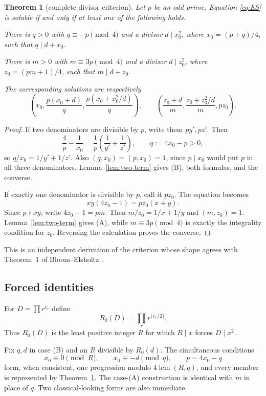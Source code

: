 \documentclass[10pt,reqno]{amsart}
\newtheorem{theorem}{Theorem}[section]
\theoremstyle{definition}
\newcommand{\lcm}{\operatorname {lcm}}
\newcommand{\1}{\mathbf 1}
\begin{document}
\begin{theorem}[complete divisor criterion]\label{thm:criterion}
Let $p$ be an odd prime.  Equation \eqref{eq:ES} is soluble if and only if at least one of the following holds.
\begin{description}[leftmargin=2.4em,style=nextline]
\item[(B)] There is $q>0$ with $q\equiv-p\pmod4$ and a divisor $d\mid x_0^2$, where $x_0=(p+q)/4$, such that $q\mid d+x_0$.
\item[(A)] There is $m>0$ with $m\equiv3p\pmod4$ and a divisor $d\mid z_0^2$, where $z_0=(pm+1)/4$, such that $m\mid d+z_0$.
\end{description}
The corresponding solutions are respectively
\[
 \left(x_0,\frac{p(x_0+d)}q,\frac{p(x_0+x_0^2/d)}q\right),
 \qquad
 \left(\frac{z_0+d}m,\frac{z_0+z_0^2/d}m,pz_0\right).
\]
\end{theorem}
\begin{proof}
If two denominators are divisible by $p$, write them $py',pz'$.  Then
\[
 \frac4p-\frac1{x_0}=\frac1p\left(\frac1{y'}+\frac1{z'}\right),
 \qquad q:=4x_0-p>0,
\]
so $q/x_0=1/y'+1/z'$.  Also $(q,x_0)=(p,x_0)=1$, since $p\mid x_0$ would put $p$ in all three denominators.  Lemma~\ref{lem:two-term} gives (B), both formulas, and the converse.

If exactly one denominator is divisible by $p$, call it $pz_0$.  The equation becomes
\[
 xy(4z_0-1)=pz_0(x+y).
\]
Since $p\nmid xy$, write $4z_0-1=pm$.  Then $m/z_0=1/x+1/y$ and $(m,z_0)=1$.  Lemma~\ref{lem:two-term} gives (A), while $m\equiv3p\pmod4$ is exactly the integrality condition for $z_0$.  Reversing the calculation proves the converse.
\end{proof}
This is an independent derivation of the criterion whose shape agrees with Theorem~1 of Bloom--Elsholtz \cite{BloomElsholtz}.

\subsection{Forced identities}
For $D=\prod r^{e_r}$ define
\begin{equation}\label{eq:R0}
 R_0(D)=\prod_r r^{\lceil e_r/2\rceil}.
\end{equation}
Thus $R_0(D)$ is the least positive integer $R$ for which $R\mid x$ forces $D\mid x^2$.

Fix $q,d$ in case (B) and an $R$ divisible by $R_0(d)$.  The simultaneous conditions
\[
 x_0\equiv0\pmod R,\qquad x_0\equiv-d\pmod q,
 \qquad p=4x_0-q
\]
form, when consistent, one progression modulo $4\lcm(R,q)$, and every member is represented by Theorem~\ref{thm:criterion}.  The case-(A) construction is identical with $m$ in place of $q$.  Two classical-looking forms are also immediate.
\end{document}
